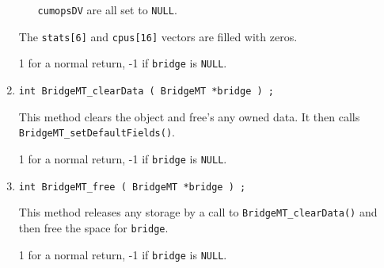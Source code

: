\begin{enumerate}
\begin{itemize}
\texttt{cumopsDV} 
are all set to \texttt{NULL}.
\end{itemize}
The \texttt{stats[6]} and \texttt{cpus[16]} vectors are filled 
with zeros.
\par {}
1 for a normal return, -1 if \texttt{bridge} is \texttt{NULL}.
\item
\begin{verbatim}
int BridgeMT_clearData ( BridgeMT *bridge ) ;
\end{verbatim}
This method clears the object and free's any owned data.
It then calls {\tt BridgeMT\_setDefaultFields()}.
\par {}
1 for a normal return, -1 if \texttt{bridge} is \texttt{NULL}.
\item
\begin{verbatim}
int BridgeMT_free ( BridgeMT *bridge ) ;
\end{verbatim}
This method releases any storage by a call to
{\tt BridgeMT\_clearData()} and then free the space for {\tt bridge}.
\par {}
1 for a normal return, -1 if \texttt{bridge} is \texttt{NULL}.
\end{enumerate}
\par
